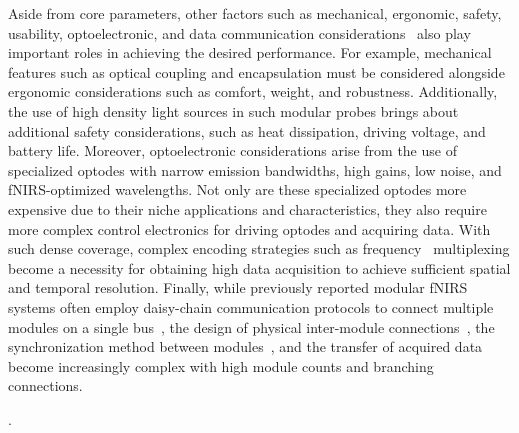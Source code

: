 Aside from  core parameters, other factors such as mechanical, ergonomic, safety, usability, optoelectronic, and data communication considerations~\cite{Zhao2017} also play important roles in achieving the desired performance. For example, mechanical features such as optical coupling and  encapsulation must be considered alongside ergonomic considerations such as comfort, weight, and robustness. Additionally, the use of high density light sources in such modular probes brings about additional safety considerations, such as heat dissipation, driving voltage, and battery life. Moreover, optoelectronic considerations arise from the use of specialized optodes with narrow emission bandwidths, high gains, low noise, and fNIRS-optimized wavelengths. Not only are these specialized optodes more expensive due to their niche applications and characteristics, they also require more complex control electronics for driving optodes and acquiring data. With such dense coverage, complex encoding strategies such as frequency~\cite{Maki1995} multiplexing become a necessity for obtaining high  data acquisition to achieve sufficient spatial and temporal resolution. Finally, while previously reported modular fNIRS systems often employ daisy-chain communication protocols to connect multiple modules on a single bus~\cite{Chitnis2016, Bci2017, Zimmermann2013, Funane2017, Zhao2019}, the design of physical inter-module connections~\cite{Zhao2021}, the synchronization method between modules~\cite{Zhao2017}, and the transfer of acquired data become increasingly complex with high module counts and branching connections.

 . 

